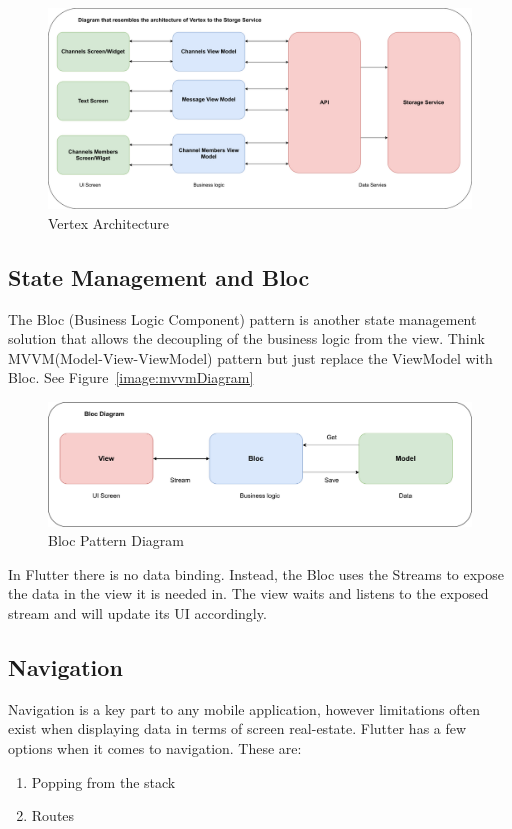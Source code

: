 \begin{figure}[h!]
    \caption{Vertex Architecture}
    \label{image:vertexArch}
    \centering
    \includegraphics[width=1.0\textwidth]{images/vertex_arch.png}
\end{figure}

\subsection{State Management and Bloc}
The Bloc (Business Logic Component) pattern is another state management solution that allows the decoupling of the business logic from the view. Think MVVM(Model-View-ViewModel) pattern but just replace the ViewModel with Bloc. 
See Figure~\ref{image:mvvmDiagram}

\begin{figure}[h!]
    \caption{Bloc Pattern Diagram}
    \label{image:blocPattern}
    \centering
    \includegraphics[width=1.0\textwidth]{images/Bloc_diagram.png}
\end{figure}

In Flutter there is no data binding. Instead, the Bloc uses the Streams to expose the data in the view it is needed in. The view waits and listens to the exposed stream and will update its UI accordingly. 

\subsection{Navigation}
Navigation is a key part to any mobile application, however limitations often exist when displaying data in terms of screen real-estate.  Flutter has a few options when it comes to navigation. These are:
\begin{enumerate}
    \item Popping from the stack
    \item Routes
\end{enumerate}

